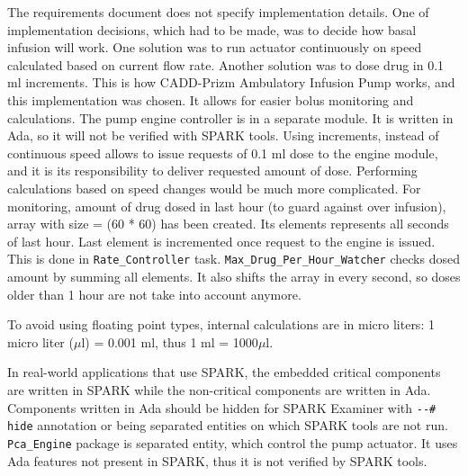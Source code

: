 The requirements document does not specify implementation details. One of implementation decisions, which had to be made, was to decide how basal infusion will work. One solution was to run actuator continuously on speed calculated based on current flow rate. Another solution was to dose drug in 0.1 ml increments. This is how CADD-Prizm Ambulatory Infusion Pump \cite{CADD-PrizmAmbulatoryInfusionPump:Online} works, and this implementation was chosen. It allows for easier bolus monitoring and calculations. The pump engine controller is in a separate module. It is written in Ada, so it will not be verified with SPARK tools. Using increments, instead of continuous speed allows to issue requests of 0.1 ml dose to the engine module, and it is its responsibility to deliver requested amount of dose. Performing calculations based on speed changes would be much more complicated. For monitoring, amount of drug dosed in last hour (to guard against over infusion), array with size = (60 * 60) has been created. Its elements represents all seconds of last hour. Last element is incremented once request to the engine is issued. This is done in \lstinline{Rate_Controller} task. \lstinline{Max_Drug_Per_Hour_Watcher} checks dosed amount by summing all elements. It also shifts the array in every second, so doses older than 1 hour are not take into account anymore.

To avoid using floating point types, internal calculations are in micro liters: 1 micro liter ($\mu$l) = 0.001 ml, thus 1 ml = 1000$\mu$l.

In real-world applications that use SPARK, the embedded critical components are written in SPARK while the non-critical components are written in Ada. Components written in Ada should be hidden for SPARK Examiner with \lstinline{--# hide} annotation or being separated entities on which SPARK tools are not run. \lstinline{Pca_Engine} package is separated entity, which control the pump actuator. It uses Ada features not present in SPARK, thus it is not verified by SPARK tools. 

